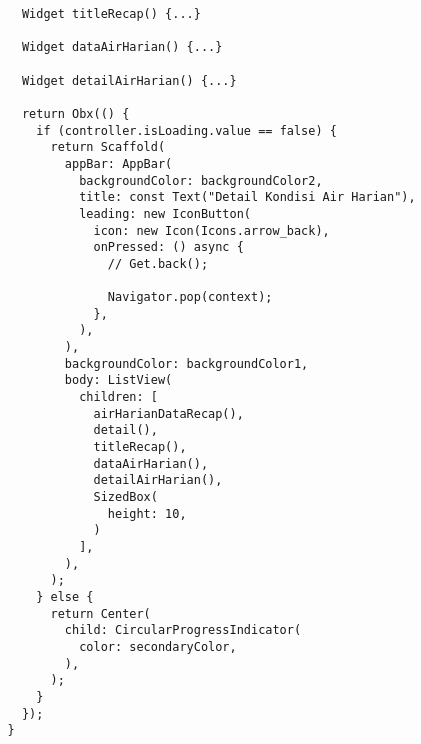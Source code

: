 \begin{lstlisting}
            Widget titleRecap() {...}
        
            Widget dataAirHarian() {...}
        
            Widget detailAirHarian() {...}
        
            return Obx(() {
              if (controller.isLoading.value == false) {
                return Scaffold(
                  appBar: AppBar(
                    backgroundColor: backgroundColor2,
                    title: const Text("Detail Kondisi Air Harian"),
                    leading: new IconButton(
                      icon: new Icon(Icons.arrow_back),
                      onPressed: () async {
                        // Get.back();
        
                        Navigator.pop(context);
                      },
                    ),
                  ),
                  backgroundColor: backgroundColor1,
                  body: ListView(
                    children: [
                      airHarianDataRecap(),
                      detail(),
                      titleRecap(),
                      dataAirHarian(),
                      detailAirHarian(),
                      SizedBox(
                        height: 10,
                      )
                    ],
                  ),
                );
              } else {
                return Center(
                  child: CircularProgressIndicator(
                    color: secondaryColor,
                  ),
                );
              }
            });
          }
        

\end{lstlisting}
